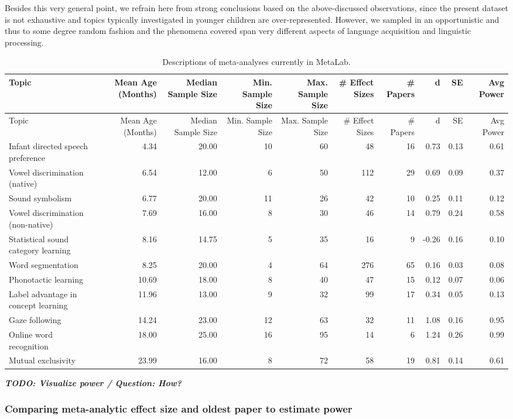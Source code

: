 \documentclass[english,floatsintext,man]{apa6}
\begin{document}
Besides this very general point, we refrain here from strong conclusions
based on the above-discussed observations, since the present dataset is
not exhaustive and topics typically investigated in younger children are
over-represented. However, we sampled in an opportunistic and thus to
some degree random fashion and the phenomena covered span very different
aspects of language acquisition and linguistic processing.

\begin{longtable}[c]{@{}lrrrrrrrrr@{}}
\caption{Descriptions of meta-analyses currently in
MetaLab.}\tabularnewline
\toprule
Topic & Mean Age (Months) & Median Sample Size & Min. Sample Size & Max.
Sample Size & \# Effect Sizes & \# Papers & d & SE & Avg
Power\tabularnewline
\midrule
\endfirsthead
\toprule
Topic & Mean Age (Months) & Median Sample Size & Min. Sample Size & Max.
Sample Size & \# Effect Sizes & \# Papers & d & SE & Avg
Power\tabularnewline
\midrule
\endhead
Infant directed speech preference & 4.34 & 20.00 & 10 & 60 & 48 & 16 &
0.73 & 0.13 & 0.61\tabularnewline
Vowel discrimination (native) & 6.54 & 12.00 & 6 & 50 & 112 & 29 & 0.69
& 0.09 & 0.37\tabularnewline
Sound symbolism & 6.77 & 20.00 & 11 & 26 & 42 & 10 & 0.25 & 0.11 &
0.12\tabularnewline
Vowel discrimination (non-native) & 7.69 & 16.00 & 8 & 30 & 46 & 14 &
0.79 & 0.24 & 0.58\tabularnewline
Statistical sound category learning & 8.16 & 14.75 & 5 & 35 & 16 & 9 &
-0.26 & 0.16 & 0.10\tabularnewline
Word segmentation & 8.25 & 20.00 & 4 & 64 & 276 & 65 & 0.16 & 0.03 &
0.08\tabularnewline
Phonotactic learning & 10.69 & 18.00 & 8 & 40 & 47 & 15 & 0.12 & 0.07 &
0.06\tabularnewline
Label advantage in concept learning & 11.96 & 13.00 & 9 & 32 & 99 & 17 &
0.34 & 0.05 & 0.13\tabularnewline
Gaze following & 14.24 & 23.00 & 12 & 63 & 32 & 11 & 1.08 & 0.16 &
0.95\tabularnewline
Online word recognition & 18.00 & 25.00 & 16 & 95 & 14 & 6 & 1.24 & 0.26
& 0.99\tabularnewline
Mutual exclusivity & 23.99 & 16.00 & 8 & 72 & 58 & 19 & 0.81 & 0.14 &
0.61\tabularnewline
\bottomrule
\end{longtable}

\textbf{\emph{TODO: Visualize power / Question: How?}}

\subsubsection{Comparing meta-analytic effect size and oldest paper to
estimate
power}\label{comparing-meta-analytic-effect-size-and-oldest-paper-to-estimate-power}
\end{document}

